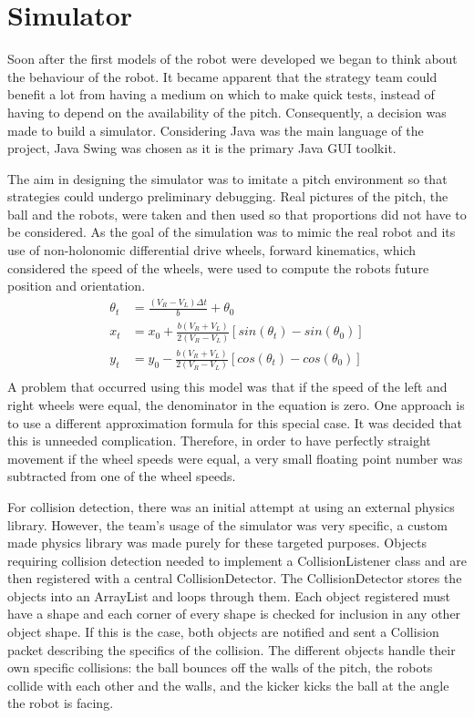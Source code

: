 \section{Simulator}

Soon after the first models of the robot were developed we began to think about the behaviour of the robot. It became apparent that the strategy team could benefit a lot from having a medium on which to make quick tests, instead of having to depend on the availability of the pitch. Consequently, a decision was made to build a simulator. Considering Java was the main language of the project, Java Swing was chosen as it is the primary Java GUI toolkit.\linebreak

The aim in designing the simulator was to imitate a pitch environment so that strategies could undergo preliminary debugging. Real pictures of the pitch, the ball and the robots, were taken and then used so that proportions did not have to be considered. As the goal of the simulation was to mimic the real robot and its use of  non-holonomic differential drive wheels, forward kinematics, which considered the speed of the wheels, were used to compute the robots future position and orientation.\linebreak
\begin{align}
\theta_{t} & = \frac{(V_{R}-V_{L})\Delta t}{b} + \theta_{0}\\
x_{t} & =x_0+ \frac{b(V_{R}+V_{L})}{2(V_{R}-V_{L})}[sin(\theta_{t})-sin(\theta_{0})]\\
y_{t} & =y_0- \frac{b(V_{R}+V_{L})}{2(V_{R}-V_{L})}[cos(\theta_{t})-cos(\theta_{0})]\\
\end{align}
A problem that occurred using this model was that if the speed of the left and right wheels were equal, the denominator in the equation is zero. One approach is to use a different approximation formula for this special case. It was decided that this is unneeded complication. Therefore, in order to have perfectly straight movement if the wheel speeds were equal, a very small floating point number was subtracted from one of the wheel speeds.\linebreak

For collision detection, there was an initial attempt at using an external physics library. However, the team’s usage of the simulator was very specific, a custom made physics library was made purely for these targeted purposes. Objects requiring collision detection needed to implement a CollisionListener class and are then registered with a central CollisionDetector. The CollisionDetector stores the objects into an ArrayList and loops through them. Each object registered must have a shape and each corner of every shape is checked for inclusion in any other object shape. If this is the case, both objects are notified and sent a Collision packet describing the specifics of the collision. The different objects handle their own specific collisions: the ball bounces off the walls of the pitch, the robots collide with each other and the walls, and the kicker kicks the ball at the angle the robot is facing. \linebreak

